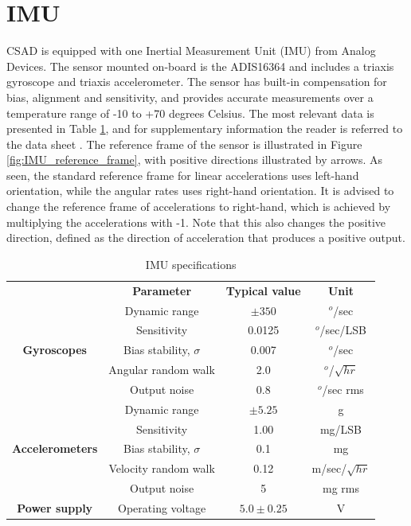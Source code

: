 \section{IMU}
CSAD is equipped with one Inertial Measurement Unit (IMU) from Analog Devices. The sensor mounted on-board is the ADIS16364 and includes a triaxis gyroscope and triaxis accelerometer. The sensor has built-in compensation for bias, alignment and sensitivity, and provides accurate measurements over a temperature range of -10 to +70 degrees Celsius. The most relevant data is presented in Table \ref{tab:IMU_specifications}, and for supplementary information the reader is referred to the data sheet \cite{adis16364}. The reference frame of the sensor is illustrated in Figure \ref{fig:IMU_reference_frame}, with positive directions illustrated by arrows. As seen, the standard reference frame for linear accelerations uses left-hand orientation, while the angular rates uses right-hand orientation. It is advised to change the reference frame of accelerations to right-hand, which is achieved by multiplying the accelerations with -1. Note that this also changes the positive direction, defined as the direction of acceleration that produces a positive output. 
\begin{table}[htb!]\caption{IMU specifications}\label{tab:IMU_specifications}
	\centering
	\begin{tabular}{c|c|c|c|}
		\cline{2-4}
		& \textbf{Parameter} & \textbf{Typical value} & \textbf{Unit}\\ \cline{1-4}
		\multicolumn{1}{|c|}{\multirow{5}{*}{\textbf{Gyroscopes}}} & Dynamic range & $\pm 350$ & $^{o}$/sec\\ 
		\multicolumn{1}{|c|}{} & Sensitivity & 0.0125 & $^{o}$/sec/LSB\\ 
		\multicolumn{1}{|c|}{} & Bias stability, $\sigma$ & 0.007 & $^{o}$/sec\\ 
		\multicolumn{1}{|c|}{} & Angular random walk & 2.0 & $^{o}$/$\sqrt{hr}$\\ 
		\multicolumn{1}{|c|}{} & Output noise & 0.8 & $^{o}$/sec rms\\ \cline{1-4}
		
		\multicolumn{1}{|c|}{\multirow{5}{*}{\textbf{Accelerometers}}} & Dynamic range & $\pm 5.25$ & g\\ 
		\multicolumn{1}{|c|}{} & Sensitivity & 1.00 & mg/LSB\\ 
		\multicolumn{1}{|c|}{} & Bias stability, $\sigma$ & 0.1 & mg\\ 
		\multicolumn{1}{|c|}{} & Velocity random walk & 0.12 & m/sec/$\sqrt{hr}$\\ 
		\multicolumn{1}{|c|}{} & Output noise & 5 & mg rms\\ \cline{1-4}
		
		\multicolumn{1}{|c|}{\multirow{1}{*}{\textbf{Power supply}}} & Operating voltage& $5.0 \pm 0.25$ & V\\ \cline{1-4}
	\end{tabular}
\end{table}
